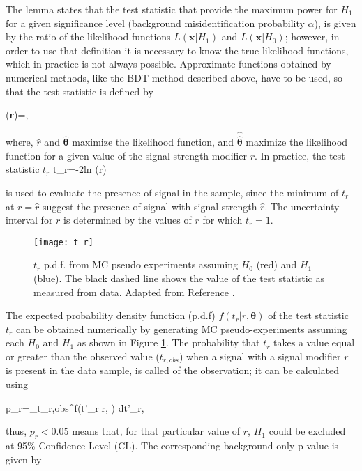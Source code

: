 The  lemma \cite{npl} states that the test statistic that provide the maximum power for $H_1$ for a given significance level (background misidentification probability $\alpha$), is given by the ratio of the likelihood functions $L(\textbf{x}|H_1)$ and $L(\textbf{x}|H_0)$; however, in order to use that definition it is necessary to know the true likelihood functions, which in practice is not always possible. Approximate functions obtained by numerical methods, like the BDT method described above, have to be used, so that the  test statistic is defined by 

\beqn
\lambda(\textbf{r})=,
\eeqn

\noindent where, $\hat r$ and $\hat{\bm{\theta}}$ maximize the likelihood function, and $\hat{\hat{\bm{\theta}}}$ maximize the likelihood function for a given value of the signal strength modifier $r$. In practice, the test statistic $t_r$
\beqn
t_r=-2\textrm{ln} \lambda(r)  
\eeqn

\noindent is used to evaluate the presence of signal in the sample, since the minimum of $t_r$ at $r=\hat r$ suggest the presence of signal with signal strength $\hat r$. The uncertainty interval for $r$ is determined by the values of $r$ for which $t_r=1$. 

\begin{figure}[!h]
  \centering
  \texttt{[image: t\_r]}
  \caption[$t_r$ p.d.f. assuming each $H_0$ and $H_1$]{ $t_r$ p.d.f. from MC pseudo experiments assuming $H_0$ (red) and $H_1$ (blue). The black dashed line shows the value of the test statistic as measured from data. Adapted from Reference \cite{luca}.}\label{fig:t_r}
\end{figure}


The expected probability density function (p.d.f) $f({t_r|r,\bm{\theta}})$ of the test statistic $t_r$ can be obtained numerically by generating MC pseudo-experiments assuming each $H_0$ and $H_1$ as shown in Figure \ref{fig:t_r}. The probability that $t_r$ takes a value equal or greater than the observed value ($t_{r,obs}$) when a signal with a signal modifier $r$ is present in the data sample, is called  of the observation; it can be calculated using 

\beqn
p_r=\int_{t_{r,obs}}^\infty f(t'_r|r, \bm{\theta}) dt'_r,
\eeqn

\noindent thus, $p_r < 0.05$ means that, for that particular value of $r$, $H_1$ could be excluded at 95\% Confidence Level (CL). The corresponding background-only p-value is given by

